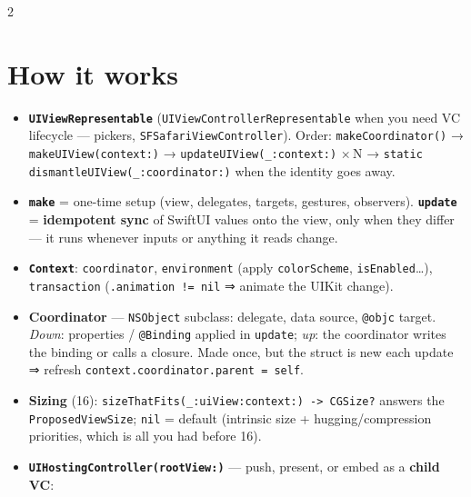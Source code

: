 \documentclass[8pt]{extarticle}
\begin{document}



\begin{multicols}{2}
\raggedright

\section{How it works}
\begin{itemize}
  \item \textbf{\texttt{UIViewRepresentable}} (\texttt{UIViewControllerRepresentable} when you need VC
        lifecycle — pickers, \texttt{SFSafariViewController}). Order: \texttt{makeCoordinator()} →
        \texttt{makeUIView(context:)} → \texttt{updateUIView(\_:context:)} ×\,N →
        \texttt{static dismantleUIView(\_:coordinator:)} when the identity goes away.
  \item \textbf{\texttt{make}} = one-time setup (view, delegates, targets, gestures, observers).
        \textbf{\texttt{update}} = \textbf{idempotent sync} of SwiftUI values onto the view, only when they
        differ — it runs whenever inputs or anything it reads change.
  \item \textbf{\texttt{Context}}: \texttt{coordinator}, \texttt{environment} (apply \texttt{colorScheme},
        \texttt{isEnabled}\ldots), \texttt{transaction} (\texttt{.animation != nil} ⇒ animate the UIKit change).
  \item \textbf{Coordinator} — \texttt{NSObject} subclass: delegate, data source, \texttt{@objc} target.
        \emph{Down}: properties / \texttt{@Binding} applied in \texttt{update}; \emph{up}: the coordinator
        writes the binding or calls a closure. Made once, but the struct is new each update ⇒ refresh
        \texttt{context.coordinator.parent = self}.
  \item \textbf{Sizing} (16): \texttt{sizeThatFits(\_:uiView:context:) -> CGSize?} answers the
        \texttt{ProposedViewSize}; \texttt{nil} = default (intrinsic size + hugging/compression
        priorities, which is all you had before 16).
  \item \textbf{\texttt{UIHostingController(rootView:)}} — push, present, or embed as a \textbf{child VC}:

\end{itemize}
\end{multicols}
\end{document}
